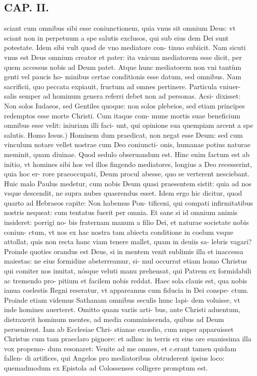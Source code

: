 \documentclass{article}
\begin{document}
\begin{pages}
\section*{CAP. II. }
\marginpar{[ p.21 ]}\pstart sciant cum omnibus sibi esse coniunctionem, quia vnus sit omnium Deus: vt sciant non in perpetuum a spe salutis exclusos, qui sub eius dem Dei sunt potestate. Idem sibi vult quod de vno mediatore con- tinuo subiicit. Nam sicuti vnus est Deus omnium creator et pater: ita vnicum mediatorem esse dicit, per quem accessus nobis ad Deum patet. Atque hunc mediatorem non vni tantùm genti vel paucis ho- minibus certae conditionis esse datum, sed omnibus. Nam sacrificii, quo peccata expiauit, fructum ad omnes pertinere. Particula vniuer- salis semper ad hominum genera referri debet non ad personas. Acsi- dixisset: Non solos Iudaeos, sed Gentiles quoque: non solos plebeios, sed etiam principes redemptos esse morte Christi. Cum itaque com- mune mortis suae beneficium omnibus esse velit: iniuriam illi faci- unt, qui opinione sua quempiam arcent a spe salutis.  \pend\pstart Homo Iesus.) Hominem dum praedicat, non negat esse Deum: sed cum vinculum notare vellet nostrae cum Deo coniuncti- onis, humanae potius naturae meminit, quam diuinae. Quod sedulo obseruandum est. Hinc enim factum est ab initio, vt homines sibi hos vel illos fingendo mediatores, longius a Deo recesserint, quia hoc er- rore praeoccupati, Deum procul abesse, quo se verterent nesciebant. Huic malo Paulus medetur, cum nobis Deum quasi praesentem sistit: quia ad nos vsque descendit, ne supra nubes quaerendus esset. Idem ergo hic dicitur, quod quarto ad Hebraeos capite: Non habemus Pon- tificeni, qui compati infirmitatibus nostris nequeat: cum tentatus fuerit per omnia. Et sane si id omnium animis insideret: porrigi no- bis fraternam manum a filio Dei, et naturae societate nobis coniun- ctum, vt nos ex hac nostra tam abiecta conditione in coelum vsque attollat, quis non recta hanc viam tenere mallet, quam in deuiis sa- lebris vagari? Proinde quoties orandus est Deus, si in mentem venit sublimis illa et inaccessa maiestas: ne eius formidine absterreamur, si- mul occurrat etiam homo Christus qui comiter nos inuitat, nósque veluti manu prehensat, qui Patrem ex formidabili ac tremendo pro- pitium et facilem nobis reddat. Haec sola clauis est, qua nobis ianua coelestis Regni reseratur, vt appareamus cum fiducia in Dei conspe- ctum. Proinde etiam videmus Sathanam omnibus seculis hunc lapi- dem voluisse, vt inde homines auerteret. Omitto quam variis arti- bus, ante Christi aduentum, distraxerit hominum mentes, ad media comminiscenda, quibus ad Deum peruenirent. Iam ab Ecclesiae Chri- stianae exordio, cum nuper apparuisset Christus cum tam praeclaro pignore: et adhuc in terris ex eius ore suauissima illa vox propemo- dum resonaret: Venite ad me omnes, et c.erant tamen quidam fallen- di artifices, qui Angelos pro mediatoribus obtruderent ipsius loco: quemadmodum ex Epistola ad Colossenses colligere promptum est.  \pend

\end{pages}
\end{document}
